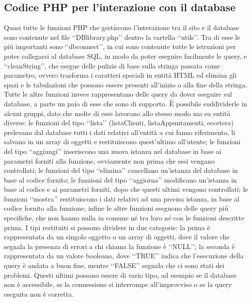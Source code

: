 {	\subsection{Codice PHP per l'interazione con il database}{
	\label{sec:PHPDB}
		Quasi tutte le funzioni PHP che gestiscono l'interazione tra il sito e il database sono contenute nel file ‘‘DBlibrary.php’’ dentro la cartella ‘‘utils’’. Tra di esse le più importanti sono ‘‘dbconnect’’, in cui sono contenute tutte le istruzioni per poter collegarsi al database SQL, in modo da poter eseguire facilmente le query, e ‘‘cleanString’’, che esegue delle pulizie di base sulla stringa passata come parametro, ovvero trasforma i caratteri speciali in entità HTML ed elimina gli spazi e le tabulazioni che possono essere presenti all'inizio o alla fine della stringa.
		Tutte le altre funzioni invece rappresentano delle query da dover eseguire sul database, a parte un paio di esse che sono di supporto. È possibile suddividerle in alcuni gruppi, dato che molte di esse lavorano allo stesso modo ma su entità diverse: le funzioni del tipo ‘‘lista’’ (listaClienti, listaAppuntamenti, eccetera) prelevano dal database tutti i dati relativi all'entità a cui fanno riferimento, li salvano in un array di oggetti e restituiscono quest'ultimo all'utente; le funzioni del tipo ‘‘aggiungi’’ inseriscono una nuova istanza nel database in base ai parametri forniti alla funzione, ovviamente non prima che essi vengano controllati; le funzioni del tipo ‘‘elimina’’ cancellano un'istanza del database in base al codice fornito; le funzioni del tipo ‘‘aggiorna’’ modificano un'istanza in base al codice e ai parametri forniti, dopo che questi ultimi vengono controllati; le funzioni ‘‘mostra’’ restituiscono i dati relativi ad una precisa istanza, in base al codice fornito alla funzione; infine le altre funzioni eseguono delle query più specifiche, che non hanno nulla in comune né tra loro né con le funzioni descritte prima.
		I tipi restituiti si possono dividere in due categorie: la prima è rappresentata da un singolo oggetto o un array di oggetti, dove il valore che segnala la presenza di errori a chi chiama la funzione è ‘‘NULL’’; la seconda è rappresentata da un valore booleano, dove ‘‘TRUE’’ indica che l'esecuzione della query è andata a buon fine, mentre ‘‘FALSE’’ segnala che ci sono stati dei problemi. Questi ultimi possono essere di vario tipo, ad esempio se il database non è accessibile, se la connessione si interrompe all'improvviso o se la query eseguita non è corretta.
}}
